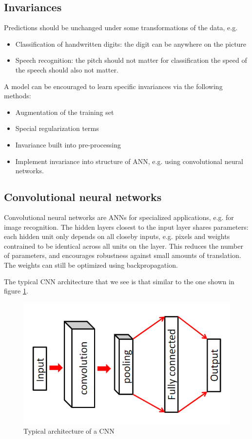\documentclass[a4paper,10pt,twoside]{article}
\begin{document}
\subsection{Invariances}
Predictions should be unchanged under some transformations of the data, e.g.
\begin{itemize}
    \item Classification of handwritten digits: the digit can be anywhere on the picture 
    \item Speech recognition: the pitch should not matter for classification the speed of the speech should also not matter.
\end{itemize} 
A model can be encouraged to learn specific invariances via the following methods:
\begin{itemize}
    \item Augmentation of the training set
    \item Special regularization terms
    \item Invariance built into pre-processing
    \item Implement invariance into structure of ANN, e.g. using convolutional neural networks.
\end{itemize}

\subsection{Convolutional neural networks}
Convolutional neural networks are ANNs for specialized applications, e.g. for image recognition. The hidden layers closest to the input layer shares parameters: each hidden unit only depends on all closeby inputs, e.g. pixels and weights contrained to be identical across all units on the layer. This reduces the number of parameters, and encourages robustness against small amounts of translation. The weights can still be optimized using backpropagation.

The typical CNN architecture that we see is that similar to the one shown in figure \ref{cnn-arch}.

\begin{figure}
    \centering
    \includegraphics[width=.5\textwidth]{figures/cnn-arch.png}
    \caption{Typical architecture of a CNN}
    \label{cnn-arch}
\end{figure}
\end{document}

